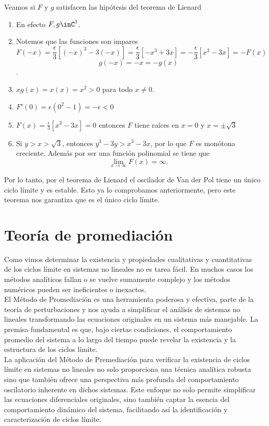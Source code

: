 \documentclass[12pt, a4paper]{report}
\begin{document}
Veamos si $F$ y $g$ satisfacen las hipótesis del teorema de Lienard
\begin{enumerate}
	\item En efecto $F,g\inC^1$.
	\item Notemos que las funciones son impares
	      $$F(-x)=\frac{\epsilon}{3}[(-x)^3-3(-x)]=\frac{\epsilon}{3}[-x^3+3x]=-\frac{\epsilon}{3}[x^3-3x]=-F(x)$$
	      $$g(-x)=-x=-g(x)$$.
	\item $xg(x)=x(x)=x^2>0$ para todo $x\neq 0$.
	\item $F'(0)=\epsilon(0^2-1)=-\epsilon<0$
	\item $F(x)=\frac{\epsilon}{3}[x^3-3x]=0$ entonces $F$ tiene raíces en $x=0$ y  $x=\pm \sqrt{3}$
	\item Si $y>x>\sqrt{3}$, entonces $y^3-3y>x^3-3x$, por lo que $F$ es monótona creciente. Además
	      por ser una función polinomial se tiene que
	      $$\lim_{x\to\infty}F(x)=\infty.$$
\end{enumerate}
Por lo tanto, por el teorema de Lienard el oscilador de Van der Pol tiene un único ciclo límite y es estable.
Esto ya lo comprobamos anteriormente, pero este teorema nos garantiza que es el único ciclo límite.

\chapter{Teoría de promediación}

Como vimos determinar la existencia y propiedades cualitativas y cuantitativas
de los ciclos límite en sistemas no lineales no es tarea fácil. En muchos
casos los métodos analíticos fallan o se vuelve sumamente complejo y los
métodos numéricos pueden ser ineficientes o inexactos. \\

El Método de Promediación es una herramienta poderosa y efectiva,
parte de la teoría de perturbaciones y nos ayuda a simplificar el análisis
de sistemas no lineales  transformando las ecuaciones originales en un sistema
más manejable. La premisa fundamental es que, bajo ciertas condiciones, el
comportamiento promedio del sistema a lo largo del tiempo puede revelar
la existencia y la estructura de los ciclos límite.\\

La aplicación del Método de Premediación para verificar la existencia de
ciclos límite en sistemas no lineales no solo proporciona una técnica
analítica robusta sino que también ofrece una perspectiva más profunda
del comportamiento oscilatorio inherente en dichos sistemas. Este enfoque
no solo permite simplificar las ecuaciones diferenciales originales, sino
también captar la esencia del comportamiento dinámico del sistema,
facilitando así la identificación y caracterización de ciclos límite.\\
\end{document}
